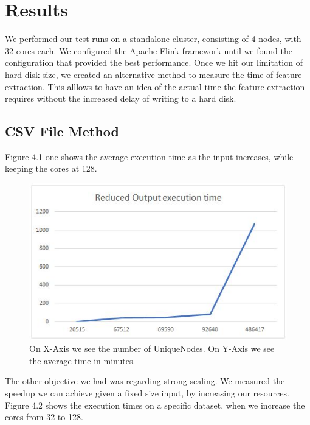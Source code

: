 \chapter{Results}

We performed our test runs on a standalone cluster, consisting of 4 nodes, with 32 cores each. We configured the Apache Flink framework until we found the configuration that provided the best performance. Once we hit our limitation of hard disk size, we created an alternative method to measure the time of feature extraction. This alllows to have an idea of the actual time the feature extraction requires without the increased delay of writing to a hard disk.


\section{CSV File Method}

Figure 4.1 one shows the average execution time as the input increases, while keeping the cores at 128.

\begin{figure}[ht]
\includegraphics[width=12cm]{Thesis/figures/figure3.JPG}
\caption{On X-Axis we see the number of Unique\newline Nodes. On Y-Axis we see the average time in minutes. }
\label{fig:graph}
\end{figure}


The other objective we had was regarding strong scaling. We measured the speedup we can achieve given a fixed size input, by increasing our resources. Figure 4.2 shows the execution times on a specific dataset, when we increase the cores from 32 to 128.

